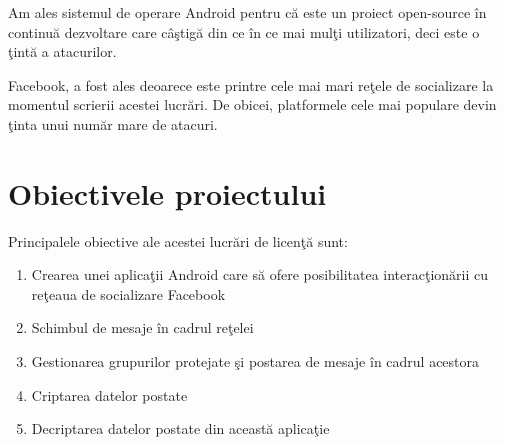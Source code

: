 Am ales sistemul de operare Android pentru c\u{a} este un proiect open-source \^{i}n continu\u{a} dezvoltare care c\^{a}\c{s}tig\u{a} din ce \^{i}n ce mai mul\c{t}i utilizatori, deci este o \c{t}int\u{a} a atacurilor.

Facebook, a fost ales deoarece este printre cele mai mari re\c{t}ele de socializare la momentul scrierii acestei lucr\u{a}ri. De obicei, platformele cele mai populare devin \c{t}inta unui num\u{a}r mare de atacuri.

\section{Obiectivele proiectului}
\label{sub-sec:proj-objectives}

Principalele obiective ale acestei lucr\u{a}ri de licen\c{t}\u{a} sunt: 

\begin{enumerate}
\item Crearea unei aplica\c{t}ii Android care s\u{a} ofere posibilitatea interac\c{t}ion\u{a}rii cu re\c{t}eaua de socializare Facebook
\item Schimbul de mesaje \^{i}n cadrul re\c{t}elei
\item Gestionarea grupurilor protejate \c{s}i postarea de mesaje \^{i}n cadrul acestora
\item Criptarea datelor postate
\item Decriptarea datelor postate din aceast\u{a} aplica\c{t}ie
\end{enumerate}

